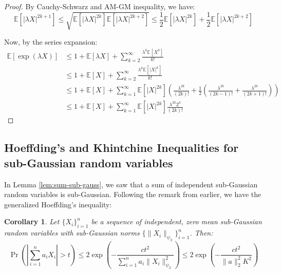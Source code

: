 \documentclass{article}
\newtheorem{corollary}{Corollary}[subsection]
\theoremstyle{remark}
\newcommand{\Exp}{\mathbb{E}}
\begin{document}
\begin{proof}
By Cauchy-Schwarz and AM-GM inequality, we have:
\begin{equation*}
\Exp[|\lambda X|^{2k + 1}] \leq \sqrt{\Exp[|\lambda X|^{2k}] \Exp[|\lambda X|^{2k + 2}]} \leq \frac{1}{2}\Exp[|\lambda X|^{2k}] + \frac{1}{2}\Exp[|\lambda X|^{2k + 2}]
\end{equation*}

Now, by the series expansion:
\begin{align*}
\Exp[\exp(\lambda X)] &\leq 1 + \Exp[\lambda X] + \sum_{k=2}^{\infty} \frac{\lambda^{k} \Exp[X^{k}]}{k!} \\
&\leq 1 + \Exp[X] + \sum_{k=2}^{\infty} \frac{\lambda^{k} \Exp[|X|^{k}]}{k!} \\
&\leq 1 + \Exp[X] + \sum_{k=1}^{\infty} \Exp[|X|^{2k}]\left(\frac{\lambda^{2k}}{(2k)!} + \frac{1}{2}\left(\frac{\lambda^{2k}}{(2k - 1)!} + \frac{\lambda^{2k}}{(2k + 1)!}\right)\right) \\
&\leq 1 + \Exp[X] + \sum_{k=1}^{\infty} \Exp[|X|^{2k}]\frac{\lambda^{2k}2^{k}}{(2k)!}
\end{align*}
\end{proof}

\subsection{Hoeffding's and Khintchine Inequalities for sub-Gaussian random variables}
In Lemma \ref{lem:sum-sub-gauss}, we saw that a sum of independent sub-Gaussian random variables is sub-Gaussian. Following the remark from earlier, we have the generalized Hoeffding's inequality:
\begin{corollary}
\label{cor:hoeffding-sub-gaussian}
Let \(\{X_{i}\}_{i=1}^{n}\) be a sequence of independent, zero mean sub-Gaussian random variables with sub-Gaussian norms \(\{\|X_{i}\|_{\psi_{2}}\}_{i=1}^{n}\). Then:
\begin{equation*}
\Pr\left(\left|\sum_{i=1}^{n} a_{i}X_{i}\right| > t\right) \leq 2\exp\left(-\frac{ct^{2}}{\sum\limits_{i=1}^{n}a_{i}\|X_{i}\|_{\psi_{2}}^{2}}\right) \leq 2\exp\left(-\frac{ct^{2}}{\|a\|_{2}^{2}K^{2}}\right)
\end{equation*}
\end{corollary}

\newpage


\end{document}
